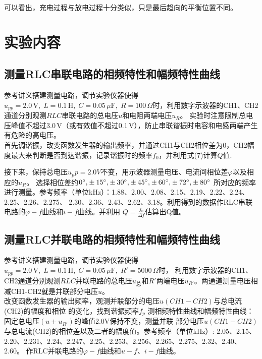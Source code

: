 \documentclass[UTF-8,twoside,cs4size]{ctexart}
\begin{document}
	可以看出，充电过程与放电过程十分类似，只是最后趋向的平衡位置不同。

\section{实验内容}
    \subsection{测量RLC串联电路的相频特性和幅频特性曲线}
    参考讲义搭建测量电路，调节实验仪器使得$ u_{pp}=2.0\,\mathrm V,\;L=0.1\,\mathrm H,\;C=0.05\,\mu\mathrm F,\;R=100\,\Omega $时，利用数字示波器的CH1、CH2通道分别观测$ RLC $串联电路的总电压$ u $和电阻两端电压$ u_R $。
    实验时注意限制总电压峰值不超过$ 3.0\,\mathrm V $（或有效值不超过0.1\,V），防止串联谐振时电容和电感两端产生有危险的高电压。 \\
	
	首先调谐振，改变函数发生器的输出频率，并通过CH1与CH2相位差为0，CH2幅度最大来判断是否到达谐振，记录谐振时的频率$ f_0 $，并利用式(7)计算$Q$值.
	
	接下来，保持总电压$u_pp=2.0V$不变，用示波器测量电压、电流间相位差$\varphi$以及相应的$u_R$。
    选择相位差约$0^\circ {\rm{,}} \pm 15^\circ {\rm{,}} \pm 30^\circ {\rm{,}} \pm 45^\circ {\rm{,}} \pm 60^\circ {\rm{,}} \pm 72^\circ {\rm{,}} \pm 80^\circ $
    所对应的频率进行测量。参考频率（单位kHz）：1.88、2.00、2.08、2.15、2.19、2.22、2.24、2.25、2.26、2.275、
    2.30、2.36、2.43、2.62、3.18。利用得到的数据作RLC串联电路的$\varphi-f$曲线和$i-f$曲线。并利用
    $Q=\frac{f_0}{\Delta f}$估算出Q值。
	
	\subsection{测量RLC并联电路的相频特性和幅频特性曲线}
    参考讲义搭建测量电路，调节实验仪器使得$ u_{pp}=2.0\,\mathrm V,\;L=0.1\,\mathrm H,\;C=0.05\,\mu\mathrm F,\;R'=5000\,\Omega $时，
    利用数字示波器的CH1、CH2通道分别观测$ RLC $并联电路的总电压$ u_总 $和$R'$两端电压$ u_{R'} $。两通道测量电压相减CH1-CH2就是并联部分电压$u$。\\
    改变函数发生器的输出频率，观测并联部分的电压$u(CH1-CH2)$与总电流(CH2)的幅度和相位
    的变化，找到谐振频率$f_p$
    测相频特性曲线和幅频特性曲线：固定总电压$(u+u_{R'})$的峰值2.0V保持不变，测量并联
    部分电压$u(CH1-CH2)$与总电流(CH2)的相位差以及二者的幅度值。参考频率（单位kHz）:
    2.05、2.15、2.20、2.231、2.24、2.247、2.25、2.253、2.256、2.265、2.275、2.32、2.40、2.60。
    作RLC并联电路的$\varphi-f$曲线和$u-f、i-f$曲线。
    
\end{document}
